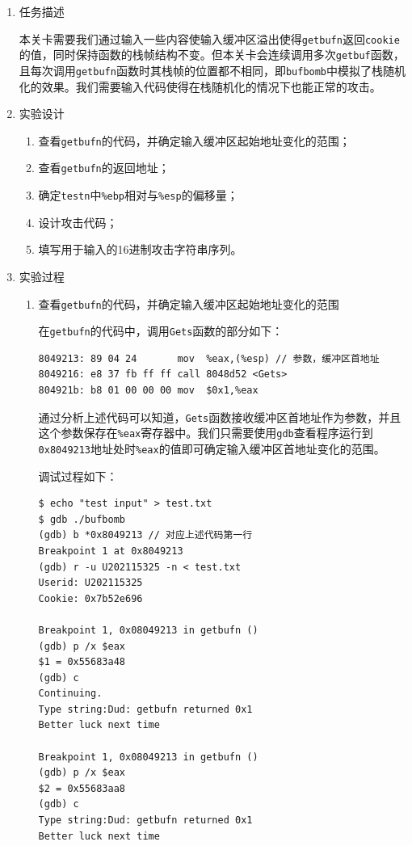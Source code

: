 \documentclass{paper}
\begin{document}
\begin{enumerate}
\item 任务描述

本关卡需要我们通过输入一些内容使输入缓冲区溢出使得\verb|getbufn|返回\verb|cookie|的值，同时保持函数的栈帧结构不变。但本关卡会连续调用多次\verb|getbuf|函数，且每次调用\verb|getbufn|函数时其栈帧的位置都不相同，即\verb|bufbomb|中模拟了栈随机化的效果。我们需要输入代码使得在栈随机化的情况下也能正常的攻击。

\item 实验设计

\begin{enumerate}
\item 查看\verb|getbufn|的代码，并确定输入缓冲区起始地址变化的范围；
\item 查看\verb|getbufn|的返回地址；
\item 确定\verb|testn|中\verb|%ebp|相对与\verb|%esp|的偏移量；
\item 设计攻击代码；
\item 填写用于输入的16进制攻击字符串序列。
\end{enumerate}

\item 实验过程

\begin{enumerate}
\item 查看\verb|getbufn|的代码，并确定输入缓冲区起始地址变化的范围
\label{l7}

在\verb|getbufn|的代码中，调用\verb|Gets|函数的部分如下：
\begin{lstlisting}
8049213: 89 04 24       mov  %eax,(%esp) // 参数，缓冲区首地址
8049216: e8 37 fb ff ff call 8048d52 <Gets>
804921b: b8 01 00 00 00 mov  $0x1,%eax
\end{lstlisting}
通过分析上述代码可以知道，\verb|Gets|函数接收缓冲区首地址作为参数，并且这个参数保存在\verb|%eax|寄存器中。我们只需要使用\verb|gdb|查看程序运行到\verb|0x8049213|地址处时\verb|%eax|的值即可确定输入缓冲区首地址变化的范围。

调试过程如下：
\begin{lstlisting}
$ echo "test input" > test.txt
$ gdb ./bufbomb
(gdb) b *0x8049213 // 对应上述代码第一行
Breakpoint 1 at 0x8049213
(gdb) r -u U202115325 -n < test.txt
Userid: U202115325
Cookie: 0x7b52e696

Breakpoint 1, 0x08049213 in getbufn ()
(gdb) p /x $eax
$1 = 0x55683a48
(gdb) c
Continuing.
Type string:Dud: getbufn returned 0x1
Better luck next time

Breakpoint 1, 0x08049213 in getbufn ()
(gdb) p /x $eax
$2 = 0x55683aa8
(gdb) c
Type string:Dud: getbufn returned 0x1
Better luck next time


\end{lstlisting}
\end{enumerate}
\end{enumerate}
\end{document}
